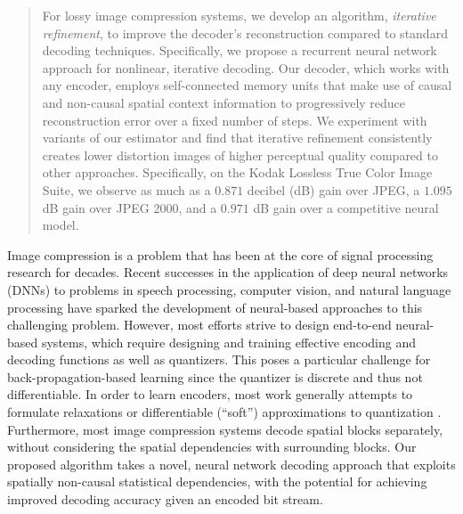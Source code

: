 \documentclass[smallabstract,smallcaptions]{dccpaper}
\begin{document}
\begin{abstract}
For lossy image compression systems, we develop an algorithm, \emph{iterative refinement}, to improve the decoder's reconstruction compared to standard decoding techniques. Specifically, we propose a recurrent neural network approach for nonlinear, iterative decoding. Our decoder, which works with any encoder, employs self-connected memory units that make use of causal and non-causal spatial context information to progressively reduce reconstruction error over a fixed number of steps. We experiment with variants of our estimator and find that iterative refinement consistently creates lower distortion images of higher perceptual quality compared to other approaches. Specifically, on the Kodak Lossless True Color Image Suite, we observe as much as a $0.871$ decibel (dB) gain over JPEG, a $1.095$ dB gain over JPEG 2000, and a $0.971$ dB gain over a competitive neural model.
\end{abstract}

\label{intro}
Image compression is a problem that has been at the core of signal processing research for decades.
Recent successes in the application of deep neural networks (DNNs) to problems in speech processing,  computer vision, and natural language processing have sparked the development of neural-based approaches to this challenging problem.
However, most efforts strive to design end-to-end neural-based systems, which require designing and training effective encoding and decoding functions as well as quantizers.
This poses a particular challenge for back-propagation-based learning since the quantizer is discrete and thus not differentiable.
In order to learn encoders, most work generally attempts to formulate relaxations or differentiable (``soft'') approximations to quantization \cite{agustsson2017}. %
Furthermore, most image compression systems decode spatial blocks separately, without considering the spatial dependencies with surrounding blocks. Our proposed algorithm takes a novel, neural network decoding approach that exploits spatially non-causal statistical dependencies, with the potential for achieving improved decoding accuracy
given an encoded bit stream.
\end{document}
